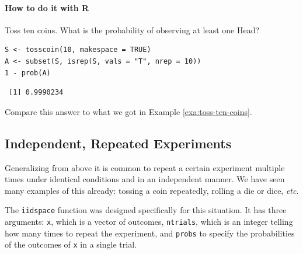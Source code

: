 \documentclass[captions=tableheading]{scrbook}
\begin{document}
\paragraph*{How to do it with \textsf{R}}

\begin{example}
Toss ten coins. What is the probability of observing at least one Head?


\begin{verbatim}
S <- tosscoin(10, makespace = TRUE)
A <- subset(S, isrep(S, vals = "T", nrep = 10))
1 - prob(A)
\end{verbatim}

\begin{verbatim}
 [1] 0.9990234
\end{verbatim}

Compare this answer to what we got in Example \ref{exa:toss-ten-coins}.

\end{example}
\subsection{Independent, Repeated Experiments}
\label{sec-3-7-1}


Generalizing from above it is common to repeat a certain experiment multiple times under identical conditions and in an independent manner. We have seen many examples of this already: tossing a coin repeatedly, rolling a die or dice, \emph{etc}.

The \texttt{iidspace} function was designed specifically for this situation. It has three arguments: \texttt{x}, which is a vector of outcomes, \texttt{ntrials}, which is an integer telling how many times to repeat the experiment, and \texttt{probs} to specify the probabilities of the outcomes of \texttt{x} in a single trial. 
\end{document}
